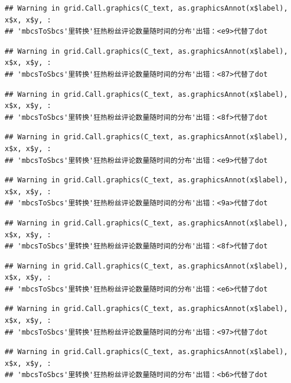 \documentclass[
]{article}
\begin{document}
\begin{verbatim}
## Warning in grid.Call.graphics(C_text, as.graphicsAnnot(x$label), x$x, x$y, :
## 'mbcsToSbcs'里转换'狂热粉丝评论数量随时间的分布'出错：<e9>代替了dot
\end{verbatim}

\begin{verbatim}
## Warning in grid.Call.graphics(C_text, as.graphicsAnnot(x$label), x$x, x$y, :
## 'mbcsToSbcs'里转换'狂热粉丝评论数量随时间的分布'出错：<87>代替了dot
\end{verbatim}

\begin{verbatim}
## Warning in grid.Call.graphics(C_text, as.graphicsAnnot(x$label), x$x, x$y, :
## 'mbcsToSbcs'里转换'狂热粉丝评论数量随时间的分布'出错：<8f>代替了dot
\end{verbatim}

\begin{verbatim}
## Warning in grid.Call.graphics(C_text, as.graphicsAnnot(x$label), x$x, x$y, :
## 'mbcsToSbcs'里转换'狂热粉丝评论数量随时间的分布'出错：<e9>代替了dot
\end{verbatim}

\begin{verbatim}
## Warning in grid.Call.graphics(C_text, as.graphicsAnnot(x$label), x$x, x$y, :
## 'mbcsToSbcs'里转换'狂热粉丝评论数量随时间的分布'出错：<9a>代替了dot
\end{verbatim}

\begin{verbatim}
## Warning in grid.Call.graphics(C_text, as.graphicsAnnot(x$label), x$x, x$y, :
## 'mbcsToSbcs'里转换'狂热粉丝评论数量随时间的分布'出错：<8f>代替了dot
\end{verbatim}

\begin{verbatim}
## Warning in grid.Call.graphics(C_text, as.graphicsAnnot(x$label), x$x, x$y, :
## 'mbcsToSbcs'里转换'狂热粉丝评论数量随时间的分布'出错：<e6>代替了dot
\end{verbatim}

\begin{verbatim}
## Warning in grid.Call.graphics(C_text, as.graphicsAnnot(x$label), x$x, x$y, :
## 'mbcsToSbcs'里转换'狂热粉丝评论数量随时间的分布'出错：<97>代替了dot
\end{verbatim}

\begin{verbatim}
## Warning in grid.Call.graphics(C_text, as.graphicsAnnot(x$label), x$x, x$y, :
## 'mbcsToSbcs'里转换'狂热粉丝评论数量随时间的分布'出错：<b6>代替了dot
\end{verbatim}
\end{document}
